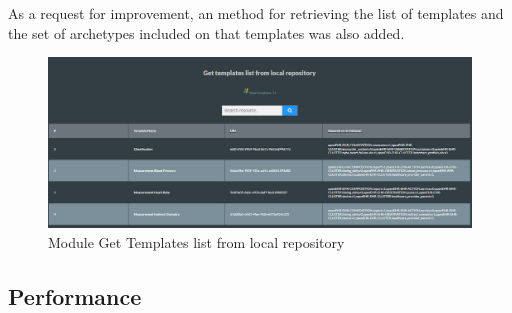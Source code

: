 \documentclass[mim_thesis.tex]{subfiles}
\begin{document}
As a request for improvement, an method for retrieving the list of templates and the set of archetypes included on that templates was also added. 

\begin{figure}[H]
	\centering
    \includegraphics[width=1\textwidth]{img/get_temp_list.PNG}
	\caption{Module Get Templates list from local repository }
	\label{fig:get_temp_list}
\end{figure}

\subsection{Performance}
\end{document}

